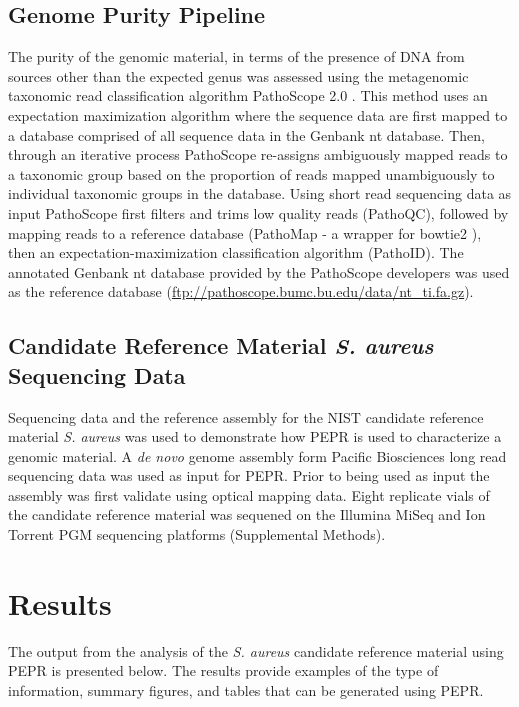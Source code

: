 \documentclass[smallextended]{svjour3}\usepackage[]{graphicx}\usepackage[]{color}
\begin{document}
\subsection{Genome Purity Pipeline}
\label{method:4}
The purity of the genomic material, in terms of the presence of DNA from sources other than the expected genus was assessed using the metagenomic taxonomic read classification algorithm PathoScope 2.0 \cite{Hong2014}.  This method uses an expectation maximization algorithm where the sequence data are first mapped to a database comprised of all sequence data in the Genbank nt database. Then, through an iterative process PathoScope re-assigns ambiguously mapped reads to a taxonomic group based on the proportion of reads mapped unambiguously to individual taxonomic groups in the database. Using short read sequencing data as input PathoScope first filters and trims low quality reads (PathoQC), followed by mapping reads to a reference database (PathoMap - a wrapper for bowtie2 \cite{Langmead2012}), then an expectation-maximization classification algorithm (PathoID).  The annotated Genbank nt database provided by the PathoScope developers was used as the reference database (\url{ftp://pathoscope.bumc.bu.edu/data/nt_ti.fa.gz}). 

\subsection{Candidate Reference Material \textit{S. aureus} Sequencing Data}
Sequencing data and the reference assembly for the NIST candidate reference material \textit{S. aureus} was used to demonstrate how PEPR is used to characterize a genomic material.  A \textit{de novo} genome assembly form Pacific Biosciences long read sequencing data was used as input for PEPR.  Prior to being used as input the assembly was first validate using optical mapping data.  Eight replicate vials of the candidate reference material was sequened on the Illumina MiSeq and Ion Torrent PGM sequencing platforms (Supplemental Methods).

\section{Results}
The output from the analysis of the \textit{S. aureus} candidate reference material using PEPR is presented below. The results provide examples of the type of information, summary figures, and tables that can be generated using PEPR.
\end{document}
